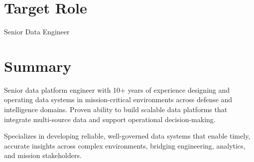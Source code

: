 \section*{Target Role}
\begin{center}
	\vspace{-0.4em}
	Senior Data Engineer
\end{center}
\vspace{-1em}


\section*{Summary}
\vspace{-0.3em}

Senior data platform engineer with 10+ years of experience designing and operating data systems in mission-critical environments across defense and intelligence domains. Proven ability to build scalable data platforms that integrate multi-source data and support operational decision-making.

Specializes in developing reliable, well-governed data systems that enable timely, accurate insights across complex environments, bridging engineering, analytics, and mission stakeholders.
